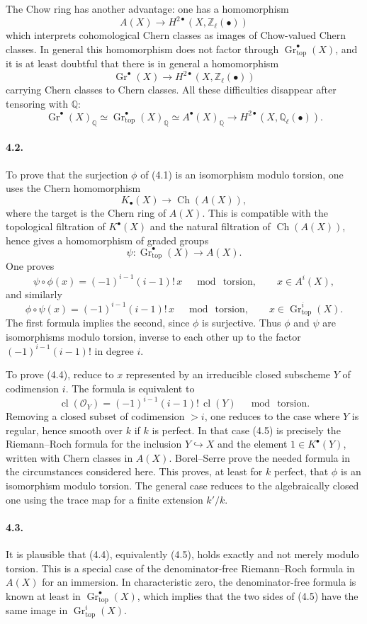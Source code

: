 \documentclass[12pt]{article}
\newcommand{\ZZ}{\mathbb Z}
\newcommand{\QQ}{\mathbb Q}
\newcommand{\cO}{\mathcal O}
\newcommand{\Gr}{\operatorname{Gr}}
\newcommand{\Ch}{\operatorname{Ch}}
\newcommand{\cl}{\operatorname{cl}}
\newcommand{\longto}{\longrightarrow}
\newcommand{\topf}{\mathrm{top}}
\begin{document}
The Chow ring has another advantage: one has a homomorphism
\[
A(X)\to H^{2\bullet}(X,\ZZ_\ell(\bullet))
\]
which interprets cohomological Chern classes as images of Chow-valued Chern classes. In general this homomorphism does not factor through $\Gr^\bullet_{\topf}(X)$, and it is at least doubtful that there is in general a homomorphism
\[
\Gr^\bullet(X)\to H^{2\bullet}(X,\ZZ_\ell(\bullet))
\]
carrying Chern classes to Chern classes. All these difficulties disappear after tensoring with $\QQ$:
\[
\Gr^\bullet(X)_\QQ\simeq
\Gr^\bullet_{\topf}(X)_\QQ\simeq
A^\bullet(X)_\QQ
\longto H^{2\bullet}(X,\QQ_\ell(\bullet)).
\tag{4.2}
\]

\paragraph{4.2.}
To prove that the surjection $\phi$ of (4.1) is an isomorphism modulo torsion, one uses the Chern homomorphism
\[
K_\bullet(X)\longto \Ch(A(X)),
\]
where the target is the Chern ring of $A(X)$. This is compatible with the topological filtration of $K^\bullet(X)$ and the natural filtration of $\Ch(A(X))$, hence gives a homomorphism of graded groups
\[
\psi:\Gr^\bullet_{\topf}(X)\longto A(X).
\tag{4.3}
\]
One proves
\[
\psi\circ\phi(x)=(-1)^{i-1}(i-1)!\,x
\quad \bmod\ \text{torsion},
\qquad x\in A^i(X),
\tag{4.4}
\]
and similarly
\[
\phi\circ\psi(x)=(-1)^{i-1}(i-1)!\,x
\quad \bmod\ \text{torsion},
\qquad x\in \Gr^i_{\topf}(X).
\]
The first formula implies the second, since $\phi$ is surjective. Thus $\phi$ and $\psi$ are isomorphisms modulo torsion, inverse to each other up to the factor $(-1)^{i-1}(i-1)!$ in degree $i$.

To prove (4.4), reduce to $x$ represented by an irreducible closed subscheme $Y$ of codimension $i$. The formula is equivalent to
\[
\cl(\cO_Y)=(-1)^{i-1}(i-1)!\,\cl(Y)
\quad\bmod\ \text{torsion}.
\tag{4.5}
\]
Removing a closed subset of codimension $>i$, one reduces to the case where $Y$ is regular, hence smooth over $k$ if $k$ is perfect. In that case (4.5) is precisely the Riemann--Roch formula for the inclusion $Y\hookrightarrow X$ and the element $1\in K^\bullet(Y)$, written with Chern classes in $A(X)$. Borel--Serre prove the needed formula in the circumstances considered here. This proves, at least for $k$ perfect, that $\phi$ is an isomorphism modulo torsion. The general case reduces to the algebraically closed one using the trace map for a finite extension $k'/k$.

\paragraph{4.3.}
It is plausible that (4.4), equivalently (4.5), holds exactly and not merely modulo torsion. This is a special case of the denominator-free Riemann--Roch formula in $A(X)$ for an immersion. In characteristic zero, the denominator-free formula is known at least in $\Gr^\bullet_{\topf}(X)$, which implies that the two sides of (4.5) have the same image in $\Gr^i_{\topf}(X)$.
\end{document}
